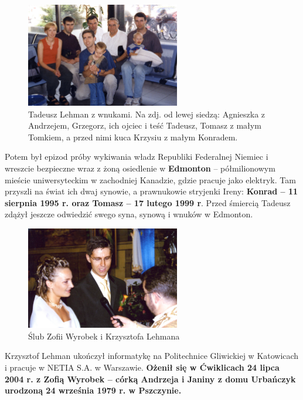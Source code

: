\begin{figure}[!h]
\begin{center}
\includegraphics[width=0.6\textwidth]{photo/tadeusz_lehman_z_wnukami.jpg}
\caption[Tadeusz Lehman z wnukami]{Tadeusz Lehman z wnukami. Na zdj. od lewej siedzą: Agnieszka z Andrzejem, Grzegorz, ich ojciec i teść Tadeusz, Tomasz z małym Tomkiem, a przed nimi kuca Krzysiu z małym Konradem.}
\label{rys:tadeusz_lehman_z_wnukami}
\end{center}
\end{figure}

Potem był epizod próby wykiwania władz Republiki Federalnej Niemiec i wreszcie bezpieczne wraz z żoną osiedlenie w \textbf{Edmonton} -- półmilionowym mieście uniwersyteckim w zachodniej Kanadzie, gdzie pracuje jako elektryk. Tam przyszli na świat ich dwaj synowie, a prawnukowie stryjenki Ireny: \textbf{Konrad -- 11 sierpnia 1995 r. oraz Tomasz -- 17 lutego 1999 r}. Przed śmiercią Tadeusz zdążył jeszcze odwiedzić swego syna, synową i wnuków w Edmonton.

\begin{figure}[!h]
\begin{center}
\includegraphics[width=0.6\textwidth]{photo/krzysztof_zofia_lehman_slub.jpg}
\caption{Ślub Zofii Wyrobek i Krzysztofa Lehmana}
\label{rys:krzysztof_zofia_lehman_slub}
\end{center}
\end{figure}

Krzysztof Lehman ukończył informatykę na Politechnice Gliwickiej w Katowicach i pracuje w NETIA S.A. w Warszawie. \textbf{Ożenił się w Ćwiklicach 24 lipca 2004 r. z Zofią Wyrobek -- córką Andrzeja i Janiny z domu Urbańczyk urodzoną 24 września 1979 r. w Pszczynie.}

